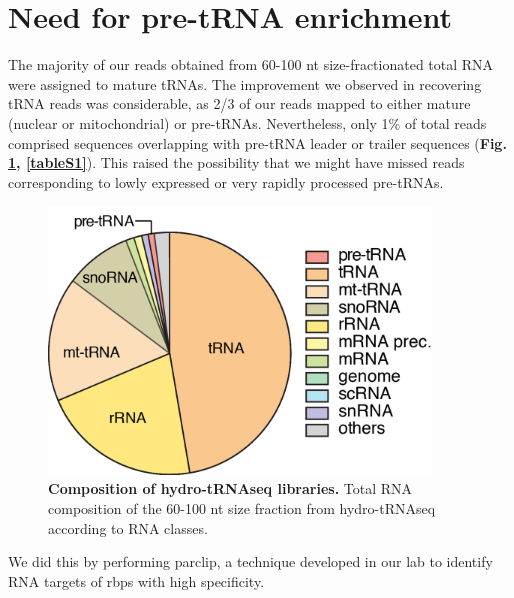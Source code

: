 \documentclass[12pt]{rockefeller}
\begin{document}
\section{Need for pre-tRNA enrichment}
The majority of our reads obtained from 60-100 nt size-fractionated total RNA were assigned to mature tRNAs. The improvement we observed in recovering tRNA reads was considerable, as 2/3 of our reads mapped to either mature (nuclear or mitochondrial) or pre-tRNAs. Nevertheless, only 1\% of total reads comprised sequences overlapping with pre-tRNA leader or trailer sequences (\textbf{Fig. \ref{paper2a}, \ref{tableS1}}). This raised the possibility that we might have missed reads corresponding to lowly expressed or very rapidly processed pre-tRNAs.
\begin{figure}[!ht]%
\centering
\includegraphics[width=4in]{paper2a.png}%
\caption[Composition of hydro-tRNAseq libraries]{\textbf{Composition of hydro-tRNAseq libraries.} Total RNA composition of the 60-100 nt size fraction from hydro-tRNAseq according to RNA classes.}
\centering
\label{paper2a}%
\end{figure}
We did this by performing \gls{parclip}, a technique developed in our lab to identify RNA targets of \glspl{rbp} with high specificity. 
\end{document}
